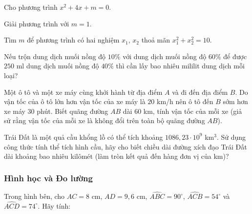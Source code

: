 \begin{practice}
\begin{questions}[series=SBT]
        \item Cho phương trình $x^2+4x+m=0$.
        \begin{questions}
            \item Giải phương trình với $m=1$.
            \answerline
            \item Tìm $m$ để phương trình có hai nghiệm $x_1$, $x_2$ thoả mãn $x_1^2+x_2^2=10$.
            \answerline
            \answerline
        \end{questions}

        \item Nếu trộn dung dịch muối nồng độ $10\%$ với dung dịch muối nồng độ $60\%$ để được $250$ ml dung dịch muối nồng độ $40\%$ thì cần lấy bao nhiêu mililit dung dịch mỗi loại?
        \answerline
        \answerline

        \item Một ô tô và một xe máy cùng khởi hành từ địa điểm $A$ và đi đến địa điểm $B$. Do vận tốc của ô tô lớn hơn vận tốc của xe máy là $20$ km/h nên ô tô đến $B$ sớm hơn xe máy $30$ phút. Biết quãng đường $AB$ dài $60$ km, tính vận tốc của mỗi xe (giả sử rằng vận tốc của mỗi xe là không đổi trên toàn bộ quãng đường $AB$).
        \answerline
        \answerline

        \item Trái Đất là một quả cầu khổng lồ có thể tích khoảng $1086{,}23\cdot10^9$ km$^3$. Sử dụng công thức tính thể tích hình cầu, hãy cho biết chiều dài đường xích đạo Trái Đất dài khoảng bao nhiêu kilômét (làm tròn kết quả đến hàng đơn vị của km)?
        \answerline
        \answerline
    \end{questions}

    \subsubsection*{Hình học và Đo lường}

    \begin{questions}[resume=SBT]
        \item Trong hình bên, cho $AC=8$ cm, $AD=9{,}6$ cm, $\widehat{ABC}=90^\circ$, $\widehat{ACB}=54^\circ$ và $\widehat{ACD}=74^\circ$.
        Hãy tính:


\end{questions}
\end{practice}
